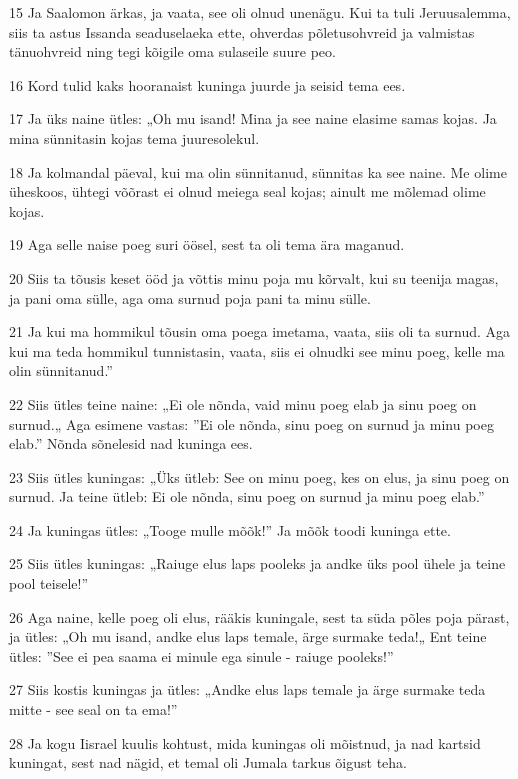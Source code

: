 \par 15 Ja Saalomon ärkas, ja vaata, see oli olnud unenägu. Kui ta tuli Jeruusalemma, siis ta astus Issanda seaduselaeka ette, ohverdas põletusohvreid ja valmistas tänuohvreid ning tegi kõigile oma sulaseile suure peo.
\par 16 Kord tulid kaks hooranaist kuninga juurde ja seisid tema ees.
\par 17 Ja üks naine ütles: „Oh mu isand! Mina ja see naine elasime samas kojas. Ja mina sünnitasin kojas tema juuresolekul.
\par 18 Ja kolmandal päeval, kui ma olin sünnitanud, sünnitas ka see naine. Me olime üheskoos, ühtegi võõrast ei olnud meiega seal kojas; ainult me mõlemad olime kojas.
\par 19 Aga selle naise poeg suri öösel, sest ta oli tema ära maganud.
\par 20 Siis ta tõusis keset ööd ja võttis minu poja mu kõrvalt, kui su teenija magas, ja pani oma sülle, aga oma surnud poja pani ta minu sülle.
\par 21 Ja kui ma hommikul tõusin oma poega imetama, vaata, siis oli ta surnud. Aga kui ma teda hommikul tunnistasin, vaata, siis ei olnudki see minu poeg, kelle ma olin sünnitanud.”
\par 22 Siis ütles teine naine: „Ei ole nõnda, vaid minu poeg elab ja sinu poeg on surnud.„ Aga esimene vastas: ”Ei ole nõnda, sinu poeg on surnud ja minu poeg elab.” Nõnda sõnelesid nad kuninga ees.
\par 23 Siis ütles kuningas: „Üks ütleb: See on minu poeg, kes on elus, ja sinu poeg on surnud. Ja teine ütleb: Ei ole nõnda, sinu poeg on surnud ja minu poeg elab.”
\par 24 Ja kuningas ütles: „Tooge mulle mõõk!” Ja mõõk toodi kuninga ette.
\par 25 Siis ütles kuningas: „Raiuge elus laps pooleks ja andke üks pool ühele ja teine pool teisele!”
\par 26 Aga naine, kelle poeg oli elus, rääkis kuningale, sest ta süda põles poja pärast, ja ütles: „Oh mu isand, andke elus laps temale, ärge surmake teda!„ Ent teine ütles: ”See ei pea saama ei minule ega sinule - raiuge pooleks!”
\par 27 Siis kostis kuningas ja ütles: „Andke elus laps temale ja ärge surmake teda mitte - see seal on ta ema!”
\par 28 Ja kogu Iisrael kuulis kohtust, mida kuningas oli mõistnud, ja nad kartsid kuningat, sest nad nägid, et temal oli Jumala tarkus õigust teha.

